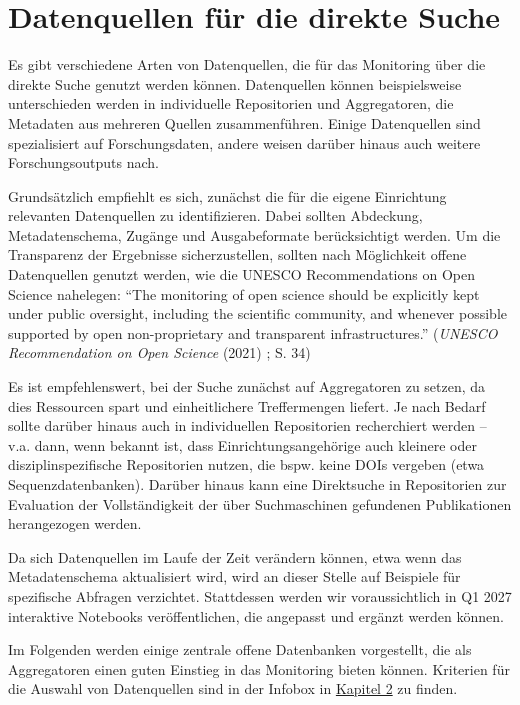 \documentclass[
  ngerman,
  letterpaper,
  DIV=11]{scrreprt}
\begin{document}
\section{Datenquellen für die direkte
Suche}\label{datenquellen-fuxfcr-die-direkte-suche}

Es gibt verschiedene Arten von Datenquellen, die für das Monitoring über
die direkte Suche genutzt werden können. Datenquellen können
beispielsweise unterschieden werden in individuelle Repositorien und
Aggregatoren, die Metadaten aus mehreren Quellen zusammenführen. Einige
Datenquellen sind spezialisiert auf Forschungsdaten, andere weisen
darüber hinaus auch weitere Forschungsoutputs nach.

Grundsätzlich empfiehlt es sich, zunächst die für die eigene Einrichtung
relevanten Datenquellen zu identifizieren. Dabei sollten Abdeckung,
Metadatenschema, Zugänge und Ausgabeformate berücksichtigt werden. Um
die Transparenz der Ergebnisse sicherzustellen, sollten nach Möglichkeit
offene Datenquellen genutzt werden, wie die UNESCO Recommendations on
Open Science nahelegen: ``The monitoring of open science should be
explicitly kept under public oversight, including the scientific
community, and whenever possible supported by open non-proprietary and
transparent infrastructures.'' (\emph{{UNESCO} Recommendation on Open
Science} (2021) ; S. 34)

Es ist empfehlenswert, bei der Suche zunächst auf Aggregatoren zu
setzen, da dies Ressourcen spart und einheitlichere Treffermengen
liefert. Je nach Bedarf sollte darüber hinaus auch in individuellen
Repositorien recherchiert werden -- v.a. dann, wenn bekannt ist, dass
Einrichtungsangehörige auch kleinere oder disziplinspezifische
Repositorien nutzen, die bspw. keine DOIs vergeben (etwa
Sequenzdatenbanken). Darüber hinaus kann eine Direktsuche in
Repositorien zur Evaluation der Vollständigkeit der über Suchmaschinen
gefundenen Publikationen herangezogen werden.

Da sich Datenquellen im Laufe der Zeit verändern können, etwa wenn das
Metadatenschema aktualisiert wird, wird an dieser Stelle auf Beispiele
für spezifische Abfragen verzichtet. Stattdessen werden wir
voraussichtlich in Q1 2027 interaktive Notebooks veröffentlichen, die
angepasst und ergänzt werden können.

Im Folgenden werden einige zentrale offene Datenbanken vorgestellt, die
als Aggregatoren einen guten Einstieg in das Monitoring bieten können.
Kriterien für die Auswahl von Datenquellen sind in der Infobox in
\hyperref[voruxfcberlegungen]{Kapitel 2} zu finden.
\end{document}

